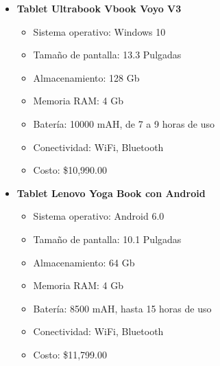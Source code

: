 \begin{itemize}
    \item \textbf{Tablet Ultrabook Vbook Voyo V3} \cite{voyo}
    \begin{itemize}
        \item Sistema operativo: Windows 10
        \item Tamaño de pantalla: 13.3 Pulgadas
        \item Almacenamiento: 128 Gb
        \item Memoria RAM: 4 Gb
        \item Batería: 10000 mAH, de 7 a 9 horas de uso
        \item Conectividad: WiFi, Bluetooth
        \item Costo: \$10,990.00
    \end{itemize}

\newpage
    \item \textbf{Tablet Lenovo Yoga Book con Android} \cite{yoga}
    \begin{itemize}
        \item Sistema operativo: Android 6.0
        \item Tamaño de pantalla: 10.1 Pulgadas
        \item Almacenamiento: 64 Gb
        \item Memoria RAM: 4 Gb
        \item Batería: 8500 mAH, hasta 15 horas de uso
        \item Conectividad: WiFi, Bluetooth
        \item Costo: \$11,799.00
    \end{itemize}
    

\end{itemize}

